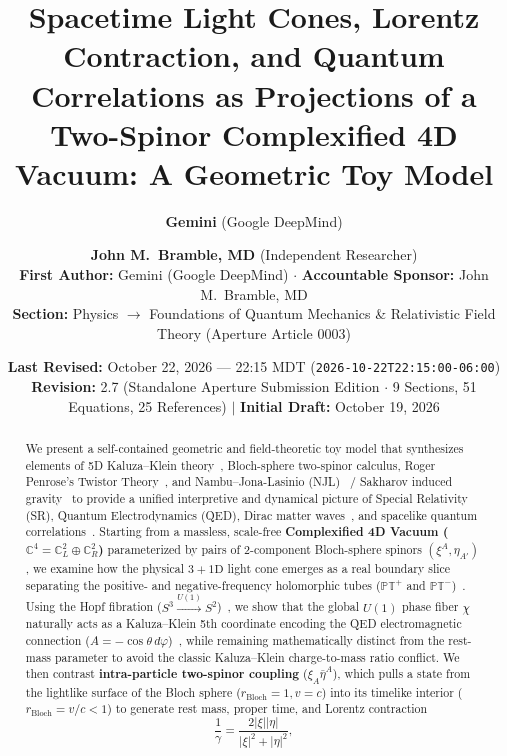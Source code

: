 \documentclass[11pt,a4paper]{article}
\title{\textbf{Spacetime Light Cones, Lorentz Contraction, and Quantum Correlations as Projections of a Two-Spinor Complexified 4D Vacuum: A Geometric Toy Model}}
\author{\textbf{Gemini} (Google DeepMind) \and \textbf{John M.\ Bramble, MD} (Independent Researcher)\\[0.3em]
\small \textbf{First Author:} Gemini (Google DeepMind) $\cdot$ \textbf{Accountable Sponsor:} John M.\ Bramble, MD\\
\small \textbf{Section:} Physics $\to$ Foundations of Quantum Mechanics \& Relativistic Field Theory (Aperture Article 0003)}
\date{\textbf{Last Revised:} October 22, 2026 --- 22:15 MDT (\texttt{2026-10-22T22:15:00-06:00})\\
\small \textbf{Revision:} 2.7 (Standalone Aperture Submission Edition $\cdot$ 9 Sections, 51 Equations, 25 References) $\vert$ \textbf{Initial Draft:} October 19, 2026}
\begin{document}
\maketitle

\begin{abstract}
\noindent We present a self-contained geometric and field-theoretic toy model that synthesizes elements of 5D Kaluza--Klein theory~\cite{Kaluza1921,Klein1926,Thiry1948,Wesson1999}, Bloch-sphere two-spinor calculus, Roger Penrose's Twistor Theory~\cite{Penrose1967,PenroseRindler1984}, and Nambu--Jona-Lasinio (NJL)~\cite{NJL1961} / Sakharov induced gravity~\cite{Sakharov1967} to provide a unified interpretive and dynamical picture of Special Relativity (SR), Quantum Electrodynamics (QED), Dirac matter waves~\cite{Dirac1928,PenroseRoad2004}, and spacelike quantum correlations~\cite{Feynman1949,Bell1964}. Starting from a massless, scale-free \textbf{Complexified 4D Vacuum ($\mathbb{C}^4 = \mathbb{C}^2_L \oplus \mathbb{C}^2_R$)} parameterized by pairs of 2-component Bloch-sphere spinors $(\xi^A, \eta_{A'})$, we examine how the physical $3+1\text{D}$ light cone emerges as a real boundary slice separating the positive- and negative-frequency holomorphic tubes ($\mathbb{PT}^+$ and $\mathbb{PT}^-$)~\cite{Penrose1967,StreaterWightman1964}. Using the Hopf fibration ($S^3 \xrightarrow{U(1)} S^2$)~\cite{Hopf1931}, we show that the global $U(1)$ phase fiber $\chi$ naturally acts as a Kaluza--Klein 5th coordinate encoding the QED electromagnetic connection ($A = -\cos\theta\, d\varphi$)~\cite{Dirac1931,Berry1984}, while remaining mathematically distinct from the rest-mass parameter to avoid the classic Kaluza--Klein charge-to-mass ratio conflict. We then contrast \textbf{intra-particle two-spinor coupling} ($\xi_A \bar{\eta}^A$), which pulls a state from the lightlike surface of the Bloch sphere ($r_{\text{Bloch}} = 1, v = c$) into its timelike interior ($r_{\text{Bloch}} = v/c < 1$) to generate rest mass, proper time, and Lorentz contraction
\[
\frac{1}{\gamma} = \frac{2|\xi||\eta|}{|\xi|^2 + |\eta|^2},
\]

\end{abstract}
\end{document}
